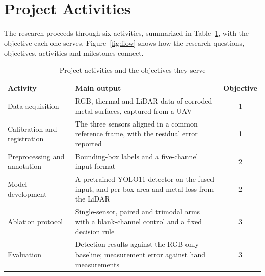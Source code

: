 \section{Project Activities}
\label{sec:project-activities}

The research proceeds through six activities, summarized in
Table~\ref{tab:activities}, with the objective each one serves.
Figure~\ref{fig:flow} shows how the research questions, objectives, activities
and milestones connect.

\begin{table}[htbp]
\centering
\caption{Project activities and the objectives they serve}
\label{tab:activities}
\small
\renewcommand{\arraystretch}{1.2}
\begin{tabularx}{\textwidth}{@{}>{\RaggedRight\arraybackslash}p{3.6cm}>{\RaggedRight\arraybackslash}Xc@{}}
\toprule
\textbf{Activity} & \textbf{Main output} & \textbf{Objective} \\
\midrule
Data acquisition & RGB, thermal and LiDAR data of corroded metal surfaces, captured from a UAV & 1 \\
Calibration and registration & The three sensors aligned in a common reference frame, with the residual error reported & 1 \\
Preprocessing and annotation & Bounding-box labels and a five-channel input format & 2 \\
Model development & A pretrained YOLO11 detector on the fused input, and per-box area and metal loss from the LiDAR & 2 \\
Ablation protocol & Single-sensor, paired and trimodal arms with a blank-channel control and a fixed decision rule & 3 \\
Evaluation & Detection results against the RGB-only baseline; measurement error against hand measurements & 3 \\
\bottomrule
\end{tabularx}
\end{table}

